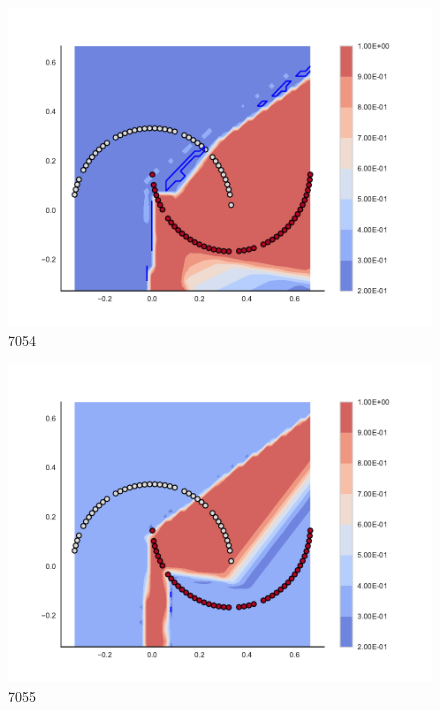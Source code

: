 \begin{subfigure}[b]{0.09\textwidth}
    \includegraphics[clip, trim=2.35cm 1.75cm 4.5cm 0cm,width=\textwidth]{img/convergence/7054.pdf}
    \caption{7054}
    \label{fig:convergence_7054}
\end{subfigure}
%
\begin{subfigure}[b]{0.09\textwidth}
    \includegraphics[clip, trim=2.35cm 1.75cm 4.5cm 0cm,width=\textwidth]{img/convergence/7055.pdf}
    \caption{7055}
    \label{fig:convergence_7055}
\end{subfigure}
%
